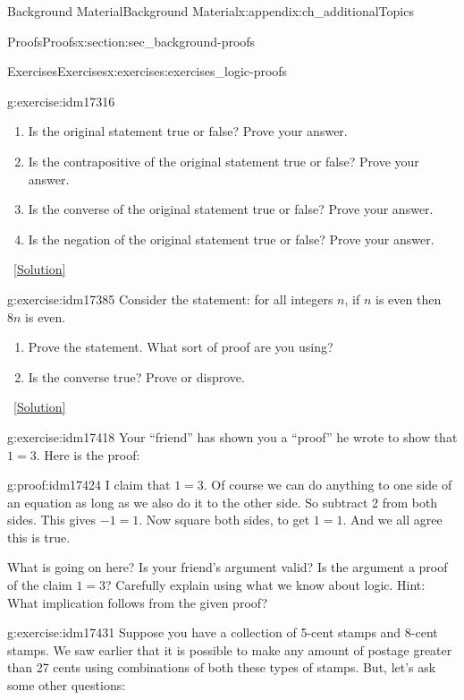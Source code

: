 \documentclass[oneside,10pt,]{book}
\numberwithin{equation}{chapter}
\begin{document}
\begin{appendixptx}{Background Material}{}{Background Material}{}{}{x:appendix:ch_additionalTopics}
\begin{sectionptx}{Proofs}{}{Proofs}{}{}{x:section:sec_background-proofs}
\begin{exercises-subsection}{Exercises}{}{Exercises}{}{}{x:exercises:exercises_logic-proofs}
\begin{divisionexercise}{1}{}{}{g:exercise:idm17316}
\begin{enumerate}[label=(\alph*)]
\item{}Is the original statement true or false? Prove your answer.%
\item{}Is the contrapositive of the original statement true or false? Prove your answer.%
\item{}Is the converse of the original statement true or false? Prove your answer.%
\item{}Is the negation of the original statement true or false? Prove your answer.%
\end{enumerate}
%
\qquad~\hfill{\tiny\hyperlink{g:solution:idm17341-main}{[Solution]}}\end{divisionexercise}%
\begin{divisionexercise}{2}{}{}{g:exercise:idm17385}%
Consider the statement: for all integers \(n\), if \(n\) is even then \(8n\) is even.%
\par
%
\begin{enumerate}[label=(\alph*)]
\item{}Prove the statement. What sort of proof are you using?%
\item{}Is the converse true? Prove or disprove.%
\end{enumerate}
%
\qquad~\hfill{\tiny\hyperlink{g:solution:idm17397-main}{[Solution]}}\end{divisionexercise}%
\begin{divisionexercise}{3}{}{}{g:exercise:idm17418}%
Your ``friend'' has shown you a ``proof'' he wrote to show that \(1 = 3\). Here is the proof:%
\begin{proofptx}{}{g:proof:idm17424}
I claim that \(1 = 3\). Of course we can do anything to one side of an equation as long as we also do it to the other side. So subtract 2 from both sides. This gives \(-1 = 1\). Now square both sides, to get \(1 = 1\). And we all agree this is true.%
\end{proofptx}
What is going on here? Is your friend's argument valid? Is the argument a proof of the claim \(1=3\)? Carefully explain using what we know about logic. Hint: What implication follows from the given proof?%
\end{divisionexercise}%
\begin{divisionexercise}{4}{}{}{g:exercise:idm17431}%
Suppose you have a collection of 5-cent stamps and 8-cent stamps. We saw earlier that it is possible to make any amount of postage greater than 27 cents using combinations of both these types of stamps. But, let's ask some other questions:%
\begin{enumerate}[label=(\alph*)]

\end{enumerate}
\end{divisionexercise}
\end{exercises-subsection}
\end{sectionptx}
\end{appendixptx}
\end{document}
